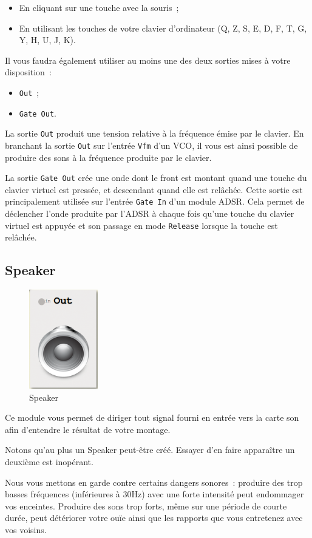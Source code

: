 \documentclass[a4paper,oneside,frenchb,10pt]{article}
\begin{document}
\begin{itemize}
\item
  En cliquant sur une touche avec la souris~;
\item
  En utilisant les touches de votre clavier d'ordinateur (Q, Z, S, E, D,
  F, T, G, Y, H, U, J, K).
\end{itemize}
Il vous faudra également utiliser au moins une des deux sorties mises à
votre disposition~:

\begin{itemize}
\item
  \verb!Out!~;
\item
  \verb!Gate Out!.
\end{itemize}
La sortie \verb!Out! produit une tension relative à la fréquence émise
par le clavier. En branchant la sortie \verb!Out! sur l'entrée
\verb!Vfm! d'un VCO, il vous est ainsi possible de produire des sons à
la fréquence produite par le clavier.

La sortie \verb!Gate Out! crée une onde dont le front est montant quand
une touche du clavier virtuel est pressée, et descendant quand elle est
relâchée. Cette sortie est principalement utilisée sur l'entrée
\verb!Gate In! d'un module ADSR. Cela permet de déclencher l'onde
produite par l'ADSR à chaque fois qu'une touche du clavier virtuel est
appuyée et son passage en mode \verb!Release! lorsque la touche est
relâchée.

\subsection{Speaker}

\begin{multicols}{2}
\begin{figure}[H]
\centering
\includegraphics[width=3cm]{../img/png/speaker.png}
\caption{Speaker}
\end{figure}

Ce module vous permet de diriger tout signal fourni en entrée vers la
carte son afin d'entendre le résultat de votre montage.

Notons qu'au plus un Speaker peut-être créé. Essayer d'en faire
apparaître un deuxième est inopérant.

Nous vous mettons en garde contre certains dangers sonores~: produire
des trop basses fréquences (inférieures à 30Hz) avec une forte intensité
peut endommager vos enceintes. Produire des sons trop forts, même sur
une période de courte durée, peut détériorer votre ouïe ainsi que les
rapports que vous entretenez avec vos voisins.
\end{multicols}
\end{document}
